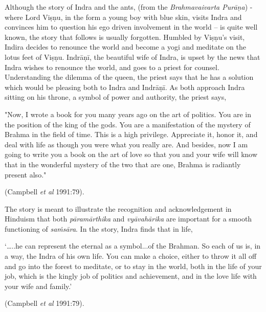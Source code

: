 \medskip

Although the story of Indra and the ants, (from the \textsl{Brahmavaivarta Purāṇa}) - where Lord Viṣṇu, in the form a young boy with blue skin, visits Indra and convinces him to question his ego driven involvement in the world -- is quite well known, the story that follows is usually forgotten. Humbled by Viṣṇu's visit, Indira decides to renounce the world and become a yogi and meditate on the lotus feet of Viṣṇu. Indrāṇī, the beautiful wife of Indra, is upset by the news that Indra wishes to renounce the world, and goes to a priest for counsel. Understanding the dilemma of the queen, the priest says that he has a solution which would be pleasing both to Indra and Indrāṇī. As both approach Indra sitting on his throne, a symbol of power and authority, the priest says, 

\begin{myquote}
"Now, I wrote a book for you many years ago on the art of politics. You are in the position of the king of the gods. You are a manifestation of the mystery of Brahma in the field of time. This is a high privilege. Appreciate it, honor it, and deal with life as though you were what you really are. And besides, now I am going to write you a book on the art of love so that you and your wife will know that in the wonderful mystery of the two that are one, Brahma is radiantly present also." 

\hfill (Campbell \textsl{et al} 1991:79).
\end{myquote}

The story is meant to illustrate the recognition and acknowledgement in Hinduism that both \textsl{pāramārthika} and \textsl{vyāvahārika} are important for a smooth functioning of \textsl{saṁsāra}. In the story, Indra finds that in life, 

\begin{myquote}
‘…..he can represent the eternal as a symbol...of the Brahman. So each of us is, in a way, the Indra of his own life. You can make a choice, either to throw it all off and go into the forest to meditate, or to stay in the world, both in the life of your job, which is the kingly job of politics and achievement, and in the love life with your wife and family.’

\hfill (Campbell \textsl{et al} 1991:79).
\end{myquote}


